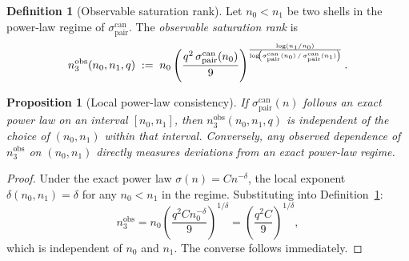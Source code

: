 \documentclass[11pt,a4paper]{article}
\newtheorem{proposition}[theorem]{Proposition}
\theoremstyle{definition}
\newtheorem{definition}[theorem]{Definition}
\theoremstyle{remark}
\begin{document}
      \begin{definition}[Observable saturation rank]
        \label{def:n3obs}
        Let $n_0 < n_1$ be two shells in the power-law regime of
        $\sigma_{\mathrm{pair}}^{\mathrm{can}}$.
        The \emph{observable saturation rank} is
        \[
          n_3^{\mathrm{obs}}(n_0, n_1, q)
          \;:=\;
          n_0
          \left(\frac{q^2\,\sigma_{\mathrm{pair}}^{\mathrm{can}}(n_0)}{9}
          \right)^{%
            \frac{\log(n_1/n_0)}{\log\!\left(
                                         \sigma_{\mathrm{pair}}^{\mathrm{can}}(n_0)\,/\,
                                         \sigma_{\mathrm{pair}}^{\mathrm{can}}(n_1)
            \right)}
          }.
        \]
      \end{definition}

      \begin{proposition}[Local power-law consistency]
        \label{prop:local-consistency}
        If $\sigma_{\mathrm{pair}}^{\mathrm{can}}(n)$ follows an
        exact power law on an interval $[n_0, n_1]$, then
        $n_3^{\mathrm{obs}}(n_0, n_1, q)$ is independent of the
        choice of $(n_0, n_1)$ within that interval.
        Conversely, any observed dependence of $n_3^{\mathrm{obs}}$
        on $(n_0, n_1)$ directly measures deviations from an exact
        power-law regime.
      \end{proposition}

      \begin{proof}
        Under the exact power law $\sigma(n) = C n^{-\delta}$,
        the local exponent $\delta(n_0, n_1) = \delta$ for any
        $n_0 < n_1$ in the regime.
        Substituting into Definition~\ref{def:n3obs}:
        \[
          n_3^{\mathrm{obs}}
          = n_0 \left(\frac{q^2 C n_0^{-\delta}}{9}\right)^{1/\delta}
          = \left(\frac{q^2 C}{9}\right)^{1/\delta},
        \]
        which is independent of $n_0$ and $n_1$.
        The converse follows immediately.
      \end{proof}
\end{document}
